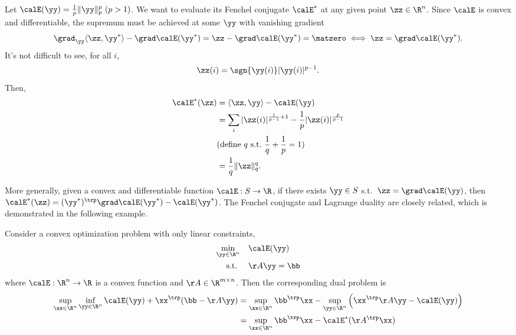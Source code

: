 \begin{example}
  Let $\calE(\yy) = \frac{1}{p}\|\yy\|_p^p ~(p>1)$. We want to evaluate its Fenchel conjugate $\calE^*$ at any given point $\zz\in\R^n$. Since $\calE$ is convex and differentiable, the supremum must be achieved at some $\yy$ with vanishing gradient
  \[ \grad_{\yy}\langle \zz,\yy^* \rangle - \grad\calE(\yy^*) = \zz - \grad\calE(\yy^*) = \matzero \iff \zz = \grad\calE(\yy^*). \]
  It's not difficult to see, for all $i$,
  \[ \zz(i) = \sgn{\yy(i)}|\yy(i)|^{p-1}. \]
  Then,
  \begin{align*}
    \calE^*(\zz)
    &= \langle \zz,\yy \rangle - \calE(\yy) \\
    &= \sum_{i}|\zz(i)|^{\frac{1}{p-1}+1} - \frac{1}{p}|\zz(i)|^{\frac{p}{p-1}} \\
    & (\text{define } q \st \frac{1}{q}+\frac{1}{p} = 1) \\
    &= \frac{1}{q} \|\zz\|_q^q.
  \end{align*}
\end{example}

More generally, given a convex and differentiable function $\calE:S\to\R$, if there exists $\yy\in S$ s.t.\ $\zz = \grad\calE(\yy)$, then $\calE^*(\zz) = (\yy^*)^\trp\grad\calE(\yy^*)-\calE(\yy^*)$.
The Fenchel conjugate and Lagrange duality are closely related, which
is demonstrated in the following example.


\begin{example}
  Consider a convex optimization problem with only linear constraints,
  \begin{align*}
    \min_{\yy\in\R^n}\quad & \calE(\yy) \\
    \st\quad  & \AA\yy = \bb
  \end{align*}
  where $\calE:\R^n\to\R$ is a convex function and $\AA\in\R^{m\times n}$.
  Then the corresponding dual problem is
  \begin{align*}
    \sup_{\xx\in\R^n}\inf_{\yy\in\R^n} \calE(\yy) + \xx^\trp(\bb-\AA\yy)
    &= \sup_{\xx\in\R^n}\bb^\trp\xx - \sup_{\yy\in\R^n} \left(\xx^\trp\AA\yy - \calE(\yy)\right) \\
    &= \sup_{\xx\in\R^n}\bb^\trp\xx - \calE^*(\AA^\trp\xx) \\
  \end{align*}
\end{example}

